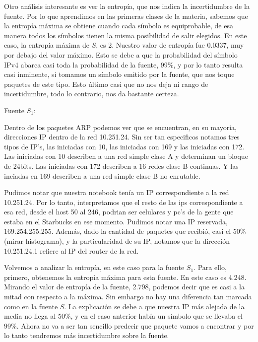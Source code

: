 Otro an\'alisis interesante es ver la entrop\'ia, que nos indica la incertidumbre de la fuente. Por lo que aprendimos en las primeras clases de la materia, sabemos que la entrop\'ia m\'axima se obtiene cuando cada s\'imbolo es equiprobable, de esa manera todos los s\'imbolos tienen la misma posibilidad de salir elegidos. En este caso, la entrop\'ia m\'axima de $S$, es 2. Nuestro valor de entrop\'ia fue 0.0337, muy por debajo del valor m\'aximo. Esto se debe a que la probabilidad del s\'imbolo IPv4 abarca casi toda la probabilidad de la fuente, 99\%, y por lo tanto resulta casi inminente, si tomamos un s\'imbolo emitido por la fuente, que nos toque paquetes de este tipo. Esto \'ultimo casi que no nos deja ni rango de incertidumbre, todo lo contrario, nos da bastante certeza. \newline

Fuente $S_1$:\newline

Dentro de los paquetes ARP podemos ver que se encuentran, en su mayoria, direcciones IP dentro de la red 10.251.24. Sin ser tan especificos notamos tres tipos de IP's, las iniciadas con 10, las iniciadas con 169 y las iniciadas con 172. Las iniciadas con 10 describen a una red simple clase A y determinan un bloque de 24bits. Las iniciadas con 172 describen a 16 redes clase B continuas. Y las inciadas en 169 describen a una red simple clase B no enrutable.\newline

Pudimos notar que nuestra notebook tenía un IP correspondiente a la red 10.251.24. Por lo tanto, interpretamos que el resto de las ips correspondiente a esa red, desde el host 50 al 246, podrian ser celulares y pc's de la gente que estaba en el Starbucks en ese momento. Pudimos notar una IP reservada, 169.254.255.255. Adem\'as, dado la cantidad de paquetes que recibió, casi el 50\% (mirar histograma), y la particularidad de su IP, notamos que la dirección 10.251.24.1 refiere al IP del router de la red.\newline

Volvemos a analizar la entrop\'ia, en este caso para la fuente $S_1$. Para ello, primero, obtenemos la entrop\'ia m\'axima para esta fuente. En este caso es 4.248. Mirando el valor de entrop\'ia de la fuente, 2.798, podemos decir que es casi a la mitad con respecto a la m\'axima. Sin embargo no hay una diferencia tan marcada como en la fuente $S$. La explicaci\'on se debe a que nuestra IP m\'as alejada de la media no llega al 50\%, y en el caso anterior hab\'ia un s\'imbolo que se llevaba el 99\%. Ahora no va a ser tan sencillo predecir que paquete vamos a encontrar y por lo tanto tendremos m\'as incertidumbre sobre la fuente.\newline




